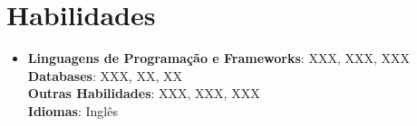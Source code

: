 \documentclass[letterpaper,11pt]{article}
\begin{document}
\section{Habilidades}
\begin{itemize}[leftmargin=0.15in, label={}]
    \item\small{
        \textbf{Linguagens de Programação e Frameworks}{: XXX, XXX, XXX} \\
        \textbf{Databases}{: XXX, XX, XX} \\
        \textbf{Outras Habilidades}{: XXX, XXX, XXX} \\
        \textbf{Idiomas}{: Inglês}}
    \vspace{-4pt}
\end{itemize}
\end{document}
